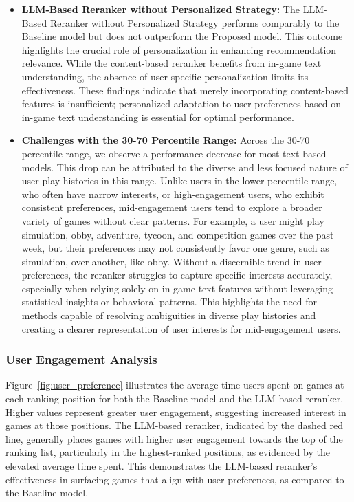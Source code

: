 \begin{itemize}[leftmargin=*]
    \item \textbf{LLM-Based Reranker without Personalized Strategy:} The LLM-Based Reranker without Personalized Strategy performs comparably to the Baseline model but does not outperform the Proposed model. This outcome highlights the crucial role of personalization in enhancing recommendation relevance. While the content-based reranker benefits from in-game text understanding, the absence of user-specific personalization limits its effectiveness. These findings indicate that merely incorporating content-based features is insufficient; personalized adaptation to user preferences based on in-game text understanding is essential for optimal performance.
    \item \textbf{Challenges with the 30-70 Percentile Range:} Across the 30-70 percentile range, we observe a performance decrease for most text-based models. This drop can be attributed to the diverse and less focused nature of user play histories in this range. Unlike users in the lower percentile range, who often have narrow interests, or high-engagement users, who exhibit consistent preferences, mid-engagement users tend to explore a broader variety of games without clear patterns. For example, a user might play simulation, obby, adventure, tycoon, and competition games over the past week, but their preferences may not consistently favor one genre, such as simulation, over another, like obby. Without a discernible trend in user preferences, the reranker struggles to capture specific interests accurately, especially when relying solely on in-game text features without leveraging statistical insights or behavioral patterns. This highlights the need for methods capable of resolving ambiguities in diverse play histories and creating a clearer representation of user interests for mid-engagement users.
\end{itemize}

\subsubsection{User Engagement Analysis}
Figure~\ref{fig:user_preference} illustrates the average time users spent on games at each ranking position for both the Baseline model and the LLM-based reranker. Higher values represent greater user engagement, suggesting increased interest in games at those positions. The LLM-based reranker, indicated by the dashed red line, generally places games with higher user engagement towards the top of the ranking list, particularly in the highest-ranked positions, as evidenced by the elevated average time spent. This demonstrates the LLM-based reranker’s effectiveness in surfacing games that align with user preferences, as compared to the Baseline model.

